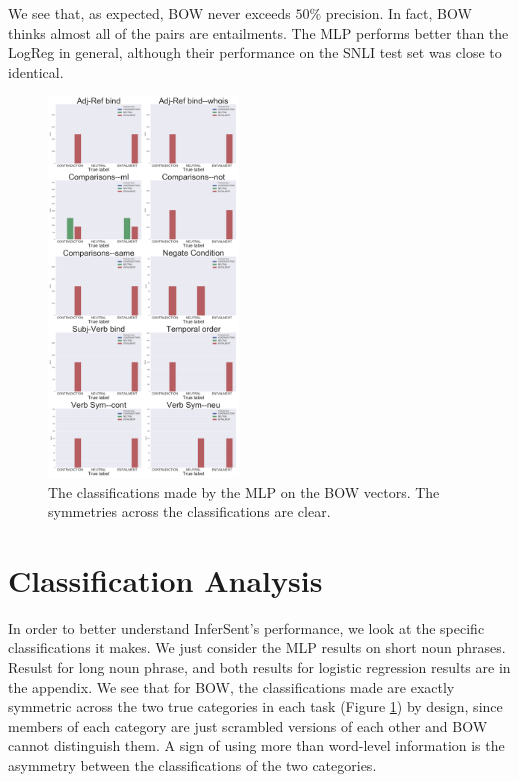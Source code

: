 \documentclass[10pt,letterpaper]{article}
\begin{document}
We see that, as expected, BOW never exceeds $50\%$ precision. In fact, BOW thinks almost all of the pairs are entailments. The MLP performs better than the LogReg in general, although their performance on the SNLI test set was close to identical. 


\begin{figure}[t!]
\centering
\includegraphics[width=0.45\textwidth]{AllHistsBOWMLPshorts.png}
\caption{The classifications made by the MLP on the BOW vectors. The symmetries across the classifications are clear.}
\label{fig:BOWhistMLPshorts}
\end{figure}

\section{Classification Analysis}

In order to better understand InferSent's performance, we look at the specific classifications it makes. We just consider the MLP results on short noun phrases. Resulst for long noun phrase, and both results for logistic regression results are in the appendix. We see that for BOW, the classifications made are exactly symmetric across the two true categories in each task (Figure \ref{fig:BOWhistMLPshorts}) by design, since members of each category are just scrambled versions of each other and BOW cannot distinguish them. A sign of using more than word-level information is the asymmetry between the classifications of the two categories.
\end{document}
